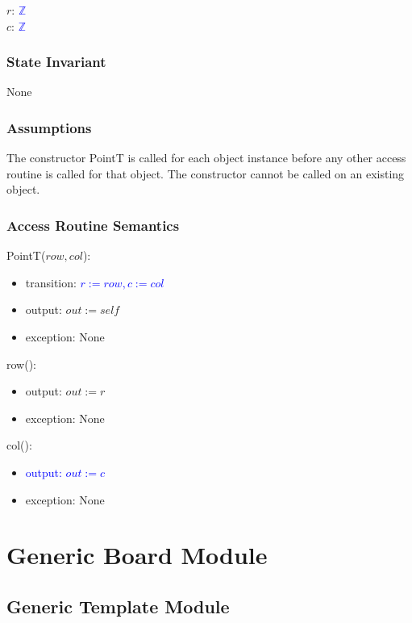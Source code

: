 \documentclass[12pt]{article}
\begin{document}
$r$: \textcolor{blue}{$\mathbb{Z}$}\\
$c$: \textcolor{blue}{$\mathbb{Z}$}\\

\subsubsection* {State Invariant}

None

\subsubsection* {Assumptions}

The constructor PointT is called for each object instance before any other
access routine is called for that object.  The constructor cannot be called on
an existing object.

\subsubsection* {Access Routine Semantics}

PointT($row, col$):
\begin{itemize}
\item transition: \textcolor{blue}{$r := row, c := col$}

\item output: $out := \mathit{self}$
\item exception: None
\end{itemize}

\noindent row():
\begin{itemize}
\item output: $out := r$
\item exception: None
\end{itemize}

\noindent col():
\begin{itemize}
\item \textcolor{blue}{output: $out := c$}
\item exception: None
\end{itemize}

\newpage

\section* {Generic Board Module}

\subsection* {Generic Template Module}
\end{document}
